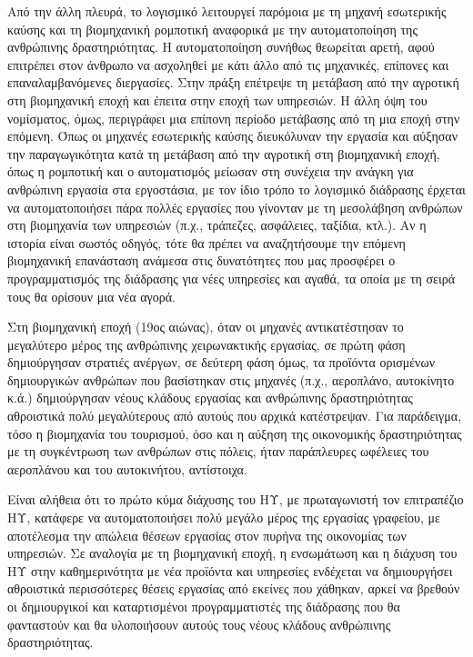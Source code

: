 \documentclass[
]{article}
\begin{document}
Από την άλλη πλευρά, το λογισμικό λειτουργεί παρόμοια με τη μηχανή
εσωτερικής καύσης και τη βιομηχανική ρομποτική αναφορικά με την
αυτοματοποίηση της ανθρώπινης δραστηριότητας. Η αυτοματοποίηση συνήθως
θεωρείται αρετή, αφού επιτρέπει στον άνθρωπο να ασχοληθεί με κάτι άλλο
από τις μηχανικές, επίπονες και επαναλαμβανόμενες διεργασίες. Στην πράξη
επέτρεψε τη μετάβαση από την αγροτική στη βιομηχανική εποχή και έπειτα
στην εποχή των υπηρεσιών. Η άλλη όψη του νομίσματος, όμως, περιγράφει
μια επίπονη περίοδο μετάβασης από τη μια εποχή στην επόμενη. Όπως οι
μηχανές εσωτερικής καύσης διευκόλυναν την εργασία και αύξησαν την
παραγωγικότητα κατά τη μετάβαση από την αγροτική στη βιομηχανική εποχή,
όπως η ρομποτική και ο αυτοματισμός μείωσαν στη συνέχεια την ανάγκη για
ανθρώπινη εργασία στα εργοστάσια, με τον ίδιο τρόπο το λογισμικό
διάδρασης έρχεται να αυτοματοποιήσει πάρα πολλές εργασίες που γίνονταν
με τη μεσολάβηση ανθρώπων στη βιομηχανία των υπηρεσιών (π.χ., τράπεζες,
ασφάλειες, ταξίδια, κτλ.). Αν η ιστορία είναι σωστός οδηγός, τότε θα
πρέπει να αναζητήσουμε την επόμενη βιομηχανική επανάσταση ανάμεσα στις
δυνατότητες που μας προσφέρει ο προγραμματισμός της διάδρασης για νέες
υπηρεσίες και αγαθά, τα οποία με τη σειρά τους θα ορίσουν μια νέα αγορά.

Στη βιομηχανική εποχή (19ος αιώνας), όταν οι μηχανές αντικατέστησαν το
μεγαλύτερο μέρος της ανθρώπινης χειρωνακτικής εργασίας, σε πρώτη φάση
δημιούργησαν στρατιές ανέργων, σε δεύτερη φάση όμως, τα προϊόντα
ορισμένων δημιουργικών ανθρώπων που βασίστηκαν στις μηχανές (π.χ.,
αεροπλάνο, αυτοκίνητο κ.ά.) δημιούργησαν νέους κλάδους εργασίας και
ανθρώπινης δραστηριότητας αθροιστικά πολύ μεγαλύτερους από αυτούς που
αρχικά κατέστρεψαν. Για παράδειγμα, τόσο η βιομηχανία του τουρισμού, όσο
και η αύξηση της οικονομικής δραστηριότητας με τη συγκέντρωση των
ανθρώπων στις πόλεις, ήταν παράπλευρες ωφέλειες του αεροπλάνου και του
αυτοκινήτου, αντίστοιχα.

Είναι αλήθεια ότι το πρώτο κύμα διάχυσης του ΗΥ, με πρωταγωνιστή τον
επιτραπέζιο ΗΥ, κατάφερε να αυτοματοποιήσει πολύ μεγάλο μέρος της
εργασίας γραφείου, με αποτέλεσμα την απώλεια θέσεων εργασίας στον πυρήνα
της οικονομίας των υπηρεσιών. Σε αναλογία με τη βιομηχανική εποχή, η
ενσωμάτωση και η διάχυση του ΗΥ στην καθημερινότητα με νέα προϊόντα και
υπηρεσίες ενδέχεται να δημιουργήσει αθροιστικά περισσότερες θέσεις
εργασίας από εκείνες που χάθηκαν, αρκεί να βρεθούν οι δημιουργικοί και
καταρτισμένοι προγραμματιστές της διάδρασης που θα φανταστούν και θα
υλοποιήσουν αυτούς τους νέους κλάδους ανθρώπινης δραστηριότητας.
\end{document}
